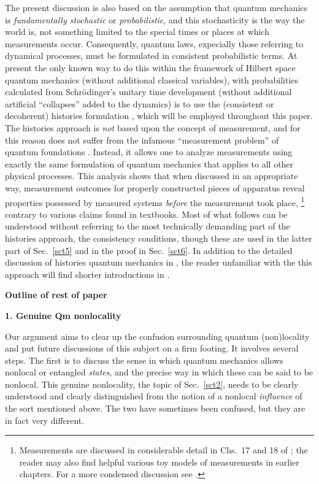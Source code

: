 \documentclass[10pt]{article} %
\def\outl#1{\par{\medskip\noindent\hspace*{.5cm}\bf
      \mathversion{bold}#1\mathversion{normal}\smallskip} }
\def\np{} \def\xa{} \def\xb{} \def\xn{} \def\xp{}
\def\outl#1{} \def\np{} \def\xa{} \def\xb{} \def\xn{} \def\xp{}
\def\outl#1{\par{\medskip\noindent\hspace*{.5cm}\bf
      \mathversion{bold}#1\mathversion{normal}\smallskip} }
\def\np{\newpage }\def\xn{\nopagebreak }\def\xp{\pagebreak }
\begin{document}
The present discussion is also based on the assumption that quantum mechanics
is \emph{fundamentally stochastic} or \emph{probabilistic}, and this
stochasticity is the way the world is, not something limited to the special
times or places at which measurements occur.  Consequently, quantum laws,
expecially those referring to dynamical processes, must be formulated in
consistent probabilistic terms.  At present the only known way to do this
within the framework of Hilbert space quantum mechanics (without additional
classical variables), with probabilities calculated from Schr\"odinger's
unitary time development (without additional artificial ``collapses'' added to
the dynamics) is to use the (consistent or decoherent) histories formulation
%
\cite{Grff84,Omns88,GMHr90,GMHr93,Grff96,Grff98,Omns99,Grff02c,GMHr07}, 
%
which will be employed throughout this paper.  The histories approach is
\emph{not} based upon the concept of measurement, and for this reason does not
suffer from the infamous ``measurement problem'' of quantum foundations
\cite{Wgnr63,BsSh96,Mttl98}.  Instead, it allows one to analyze measurements
using exactly the same formulation of quantum mechanics that applies to all
other physical processes. This analysis shows that when discussed in an
appropriate way, measurement outcomes for properly constructed pieces of
apparatus reveal properties possessed by measured systems \emph{before} the
measurement took place,%
\footnote{Measurements are discussed in considerable detail in Chs.~17 and 18
  of \cite{Grff02c}; the reader may also find helpful various toy models of
  measurements in earlier chapters.  For a more condensed discussion see
  \cite{Grff10}.} %
contrary to various claims found in textbooks.
%
Most of what follows can be understood without referring to the most
technically demanding part of the histories approach, the consistency
conditions, though these are used in the latter part of Sec.~\ref{sct5} and in
the proof in Sec.~\ref{sct6}.  In addition to the detailed discussion of
histories quantum mechanics in \cite{Grff02c}, the reader unfamiliar with the
this approach will find shorter introductions in
\cite{Grff09b,Hhnb10,Grff10}.


\xb
\outl{Outline of rest of paper}
\xa

\xb
\outl{1. Genuine Qm nonlocality}
\xa



Our argument aims to clear up the confusion surrounding quantum (non)locality
and put future discussions of this subject on a firm footing.  It involves
several steps.  The first is to discuss the sense in which quantum mechanics
allows nonlocal or entangled \emph{states}, and the precise way in which these
can be said to be nonlocal.  This genuine nonlocality, the topic of
Sec.~\ref{sct2}, needs to be clearly understood and clearly distinguished from
the notion of a nonlocal \emph{influence} of the sort mentioned above.  The
two have sometimes been confused, but they are in fact very different.
\end{document}
